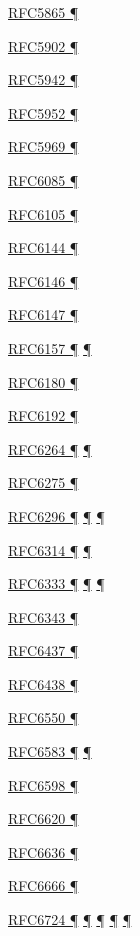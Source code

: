 \documentclass[
]{article}
\begin{document}
\hyperref[traffic-class-and-flow-label]{RFC5865 ¶}

\hyperref[translation-and-ipv4-as-a-service]{RFC5902 ¶}

\hyperref[auto-configuration]{RFC5942 ¶}

\hyperref[addresses]{RFC5952 ¶}

\hyperref[tunnels]{RFC5969 ¶}

\hyperref[layer-2-functions]{RFC6085 ¶}

\hyperref[layer-2-considerations]{RFC6105 ¶}

\hyperref[translation-and-ipv4-as-a-service]{RFC6144 ¶}

\hyperref[translation-and-ipv4-as-a-service]{RFC6146 ¶}

\hyperref[translation-and-ipv4-as-a-service]{RFC6147 ¶}

\hyperref[dual-stack-scenarios]{RFC6157 ¶} \hyperref[multihoming]{¶}

\hyperref[coexistence-with-legacy-ipv4]{RFC6180 ¶}

\hyperref[filtering]{RFC6192 ¶}

\hyperref[obsolete-techniques]{RFC6264 ¶} \hyperref[tunnels]{¶}

\hyperref[obsolete-features-in-ipv6]{RFC6275 ¶}

\hyperref[translation-and-ipv4-as-a-service]{RFC6296 ¶}
\hyperref[security]{¶} \hyperref[multihoming]{¶}

\hyperref[translation-and-ipv4-as-a-service]{RFC6314 ¶}
\hyperref[multihoming]{¶}

\hyperref[dual-stack-scenarios]{RFC6333 ¶}
\hyperref[translation-and-ipv4-as-a-service]{¶} \hyperref[tunnels]{¶}

\hyperref[obsolete-techniques]{RFC6343 ¶}

\hyperref[traffic-class-and-flow-label]{RFC6437 ¶}

\hyperref[traffic-class-and-flow-label]{RFC6438 ¶}

\hyperref[routing]{RFC6550 ¶}

\hyperref[address-resolution]{RFC6583 ¶}
\hyperref[layer-2-considerations]{¶}

\hyperref[address-planning]{RFC6598 ¶}

\hyperref[layer-2-considerations]{RFC6620 ¶}

\hyperref[address-resolution]{RFC6636 ¶}

\hyperref[filtering]{RFC6666 ¶}

\hyperref[how-an-application-programmer-sees-ipv6]{RFC6724 ¶}
\hyperref[dns]{¶} \hyperref[source-and-destination-address-selection]{¶}
\hyperref[multi-prefix-operation]{¶}
\hyperref[obsolete-features-in-ipv6]{¶}
\end{document}
